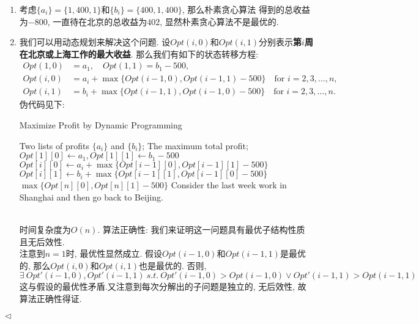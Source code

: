 \documentclass[11pt]{article}
\newenvironment{answer}[1][Answer]{\begin{trivlist}
\item[\hskip \labelsep{\bfseries\itshape#1.}\hskip \labelsep]}{\hfill$\lhd$\end{trivlist}}
\begin{document}
\begin{answer}
    \begin{enumerate}[label = (\arabic*)]
        \item 考虑$\{a_i\} = \{1, 400, 1\}$和$\{b_i\} = \{400, 1, 400\}$, 那么朴素贪心算法
        得到的总收益为$-800$, 一直待在北京的总收益为$402$, 显然朴素贪心算法不是最优的.
        \item 我们可以用动态规划来解决这个问题. 设$Opt(i, 0)$和$Opt(i, 1)$分别表示\textbf{第$i$周在北京或上海工作的最大收益}.
        那么我们有如下的状态转移方程:
        \begin{align*}
            Opt(1, 0) &= a_1, \quad Opt(1, 1) = b_1-500, \\
            Opt(i, 0) &= a_i + \max\{Opt(i-1, 0), Opt(i-1, 1) - 500\} 
            \quad \text{for } i = 2, 3, \dots, n, \\
            Opt(i, 1) &= b_i + \max\{Opt(i-1, 1), Opt(i-1, 0) - 500\}
            \quad \text{for } i = 2, 3, \dots, n.
        \end{align*}伪代码见下:
        \begin{algorithm}[ht]
            \caption{Maximize Profit by Dynamic Programming}
            \begin{algorithmic}[1]
            \Require Two lists of profits $\{a_i\}$ and $\{b_i\}$;
            \Ensure The maximum total profit; 
            \State $Opt[1][0] \leftarrow a_1, Opt[1][1] \leftarrow b_1 - 500$ 
                \State $Opt[i][0] \leftarrow a_i + \max\{Opt[i-1][0], Opt[i-1][1] - 500\}$
                \State $Opt[i][1] \leftarrow b_i + \max\{Opt[i-1][1], Opt[i-1][0] - 500\}$
            \EndFor 
            \State \Return $\max\{Opt[n][0], Opt[n][1] - 500\}$ 
            \Statex \Comment Consider the last week work in Shanghai and then go back to Beijing.
            \end{algorithmic}
        \end{algorithm}
        \\时间复杂度为$O(n)$. 算法正确性: 我们来证明这一问题具有最优子结构性质且无后效性.\\
        注意到$n=1$时, 最优性显然成立. 假设$Opt(i-1, 0)$和$Opt(i-1, 1)$是最优的, 那么$Opt(i,0)$和$Opt(i,1)$也是最优的.
        否则, \[\exists ~ Opt'(i-1, 0), Opt'(i-1, 1) ~ s.t.~ Opt'(i-1, 0) > 
        Opt(i-1, 0) \lor Opt'(i-1, 1) > Opt(i-1, 1)\]这与假设的最优性矛盾.又注意到每次分解出的子问题是独立的, 无后效性, 故算法正确性得证.
    \end{enumerate}
\end{answer}
\end{document}
